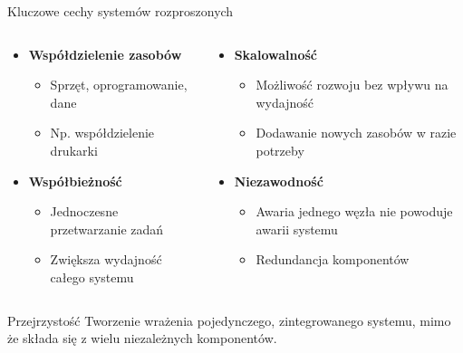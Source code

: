 \documentclass[aspectratio=169]{beamer}
\begin{document}
\begin{frame}{Kluczowe cechy systemów rozproszonych}
    \begin{columns}
        \begin{column}{0.5\textwidth}
            \begin{itemize}
                \item \textbf{Współdzielenie zasobów}
                \begin{itemize}
                    \small
                    \item Sprzęt, oprogramowanie, dane
                    \item Np. współdzielenie drukarki
                \end{itemize}
                \vspace{0.2cm}
                \item \textbf{Współbieżność}
                \begin{itemize}
                    \small
                    \item Jednoczesne przetwarzanie zadań
                    \item Zwiększa wydajność całego systemu
                \end{itemize}
            \end{itemize}
        \end{column}
        \begin{column}{0.5\textwidth}
            \begin{itemize}
                \item \textbf{Skalowalność}
                \begin{itemize}
                    \small
                    \item Możliwość rozwoju bez wpływu na wydajność
                    \item Dodawanie nowych zasobów w razie potrzeby
                \end{itemize}
                \vspace{0.2cm}
                \item \textbf{Niezawodność}
                \begin{itemize}
                    \small
                    \item Awaria jednego węzła nie powoduje awarii systemu
                    \item Redundancja komponentów
                \end{itemize}
            \end{itemize}
        \end{column}
    \end{columns}
    \vspace{0.3cm}
    \begin{block}{Przejrzystość}
        Tworzenie wrażenia pojedynczego, zintegrowanego systemu, mimo że składa się z wielu niezależnych komponentów.
    \end{block}
\end{frame}
\end{document}
